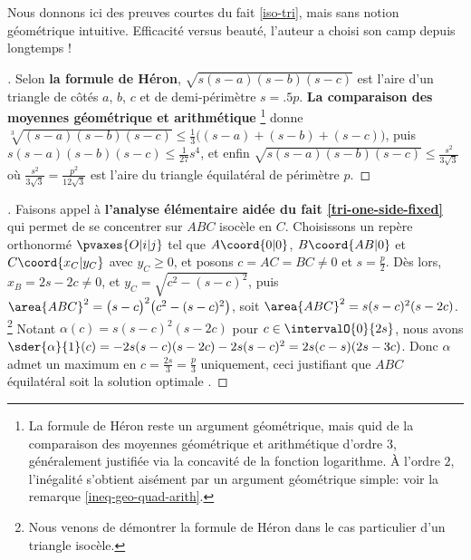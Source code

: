 \leavevmode

\smallskip

Nous donnons ici des preuves courtes du fait \ref{iso-tri}, mais sans notion géométrique intuitive. Efficacité versus beauté, l'auteur a choisi son camp depuis longtemps !




\begin{proof}[]
	Selon \textbf{la formule de Héron},
	$\sqrt{s(s - a)(s - b)(s - c)}$
	est l'aire d'un triangle de côtés $a$, $b$, $c$ et de demi-périmètre $s = \num{.5} p$.
	\textbf{La comparaison des moyennes géométrique et arithmétique}%
	\footnote{
		La formule de Héron reste un argument géométrique, mais quid de la comparaison des moyennes géométrique et arithmétique d'ordre $3$, généralement justifiée via la concavité de la fonction logarithme.
		À l'ordre $2$, l'inégalité s'obtient aisément par un argument géométrique simple: voir la remarque \ref{ineq-geo-quad-arith}.
	}
	donne
	$\sqrt[3]{(s - a)(s - b)(s - c)} \leq \frac13 \big( (s - a) + (s - b) + (s - c) \big)$,
	puis
	$s(s - a)(s - b)(s - c) \leq \frac{1}{27} s^4$,
	et enfin
	$\sqrt{s(s - a)(s - b)(s - c)} \leq \frac{s^2}{3 \sqrt{3}}$
	où $\frac{s^2}{3 \sqrt{3}} = \frac{p^2}{12 \sqrt{3}}$ est l'aire du triangle équilatéral de périmètre $p$.
\end{proof}




\begin{proof}[]
	Faisons appel à \textbf{l'analyse élémentaire aidée du fait \ref{tri-one-side-fixed}} qui permet de se concentrer sur $ABC$ isocèle en $C$. 
	Choisissons un repère orthonormé $\pvaxes{O | i | j}$ tel que  $A\coord{0 | 0}$, $B\coord{AB | 0}$ et $C\coord{x_C | y_C}$ avec $y_C \geq 0$, et posons $c = AC = BC \neq 0$ et $s = \frac{p}{2}$.
	Dès lors,
	$x_B = 2 s - 2 c \neq 0$, et 
	$y_C = \sqrt{c^2 - (s - c)^2}$, 
	puis
	$\area{ABC}^2 = \big( s - c \big)^2 \big( c^2 - (s - c)^2 \big)$,
	soit
	$\area{ABC}^2 = s (s - c)^2 (s - 2 c)$.%
	\footnote{
		Nous venons de démontrer la formule de Héron dans le cas particulier d'un triangle isocèle.
	}
	Notant $\alpha(c) = s (s - c)^2 (s - 2 c)$ pour $c \in \intervalO{0}{2 s}$, nous avons $\sder{\alpha}{1}(c) = - 2 s (s - c) (s - 2 c) - 2 s (s - c)^2 = 2 s (c - s) (2s - 3c)$.
	Donc $\alpha$ admet un maximum en $c = \frac{2s}{3} = \frac{p}{3}$ uniquement,
	ceci justifiant que $ABC$ équilatéral soit la solution \og optimale \fg.
\end{proof}


